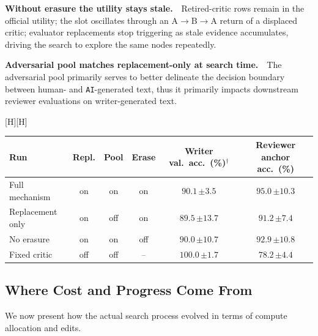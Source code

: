 \documentclass{paper}
\makeatletter
\newenvironment{widetable}[1][tbp]
  {\ifpaper@twocolumn \@nameuse{table*}[#1]\else \@nameuse{table}[#1]\fi}
  {\ifpaper@twocolumn \@nameuse{endtable*}\else \@nameuse{endtable}\fi}
\newcommand{\AI}{\texttt{AI}}
\makeatother
\begin{document}
\noindent\textbf{Without erasure the utility stays stale.}~~Retired-critic rows remain in the official utility; the slot oscillates through an A$\to$B$\to$A return of a displaced critic; evaluator replacements stop triggering as stale evidence accumulates, driving the search to explore the same nodes repeatedly.

\noindent\textbf{Adversarial pool matches replacement-only at search time.}~~The adversarial pool primarily serves to better delineate the decision boundary between human- and \AI-generated text, thus it primarily impacts downstream reviewer evaluations on writer-generated text.

\begin{widetable}[H]
\centering
\caption{\textbf{Mechanism ablations on the evaluator-independent anchor.} All runs use a $12{,}288$-evaluation budget. Reviewer anchor accuracy is comparable across runs, while writer acceptance ($\dagger$), scored by each run's own critic, is not. Cells report mean $\pm$ 95\% Jeffreys interval.}
\label{tab:nemotron-runs}
\small
\setlength{\tabcolsep}{4.5pt}
\begin{tabular}{l c c c c c}
\toprule
Run & Repl. & Pool & Erase & Writer val.\ acc.\ (\%)$^{\dagger}$ & Reviewer anchor acc.\ (\%) \\
\midrule
Full mechanism & on & on & on & $90.1$\,{\color{black!55}\scriptsize$\pm 3.5$} & $95.0$\,{\color{black!55}\scriptsize$\pm 10.3$} \\
Replacement only & on & off & on & $89.5$\,{\color{black!55}\scriptsize$\pm 13.7$} & $91.2$\,{\color{black!55}\scriptsize$\pm 7.4$} \\
No erasure & on & on & off & $90.0$\,{\color{black!55}\scriptsize$\pm 10.7$} & $92.9$\,{\color{black!55}\scriptsize$\pm 10.8$} \\
\addlinespace
Fixed critic & off & off & {--} & $100.0$\,{\color{black!55}\scriptsize$\pm 1.7$} & $78.2$\,{\color{black!55}\scriptsize$\pm 4.4$} \\
\bottomrule
\end{tabular}
\end{widetable}


\subsection{Where Cost and Progress Come From}
\label{app:analyses}

We now present how the actual search process evolved in terms of compute allocation and edits.
\end{document}
